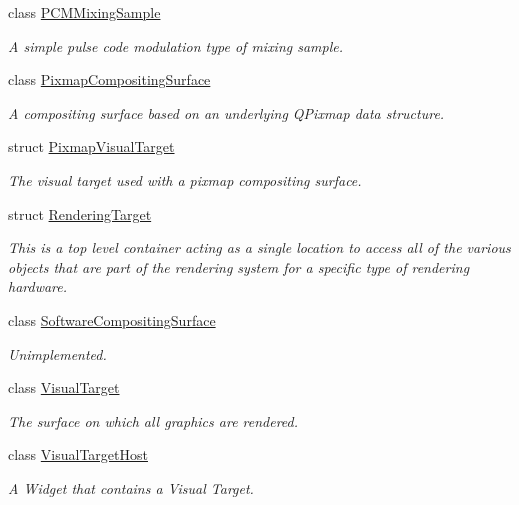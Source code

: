 \begin{DoxyCompactItemize}
class \hyperlink{class_picto_1_1_p_c_m_mixing_sample}{P\-C\-M\-Mixing\-Sample}
\begin{DoxyCompactList}\small\item\em A simple pulse code modulation type of mixing sample. \end{DoxyCompactList}\item 
class \hyperlink{class_picto_1_1_pixmap_compositing_surface}{Pixmap\-Compositing\-Surface}
\begin{DoxyCompactList}\small\item\em A compositing surface based on an underlying Q\-Pixmap data structure. \end{DoxyCompactList}\item 
struct \hyperlink{struct_picto_1_1_pixmap_visual_target}{Pixmap\-Visual\-Target}
\begin{DoxyCompactList}\small\item\em The visual target used with a pixmap compositing surface. \end{DoxyCompactList}\item 
struct \hyperlink{struct_picto_1_1_rendering_target}{Rendering\-Target}
\begin{DoxyCompactList}\small\item\em This is a top level container acting as a single location to access all of the various objects that are part of the rendering system for a specific type of rendering hardware. \end{DoxyCompactList}\item 
class \hyperlink{class_picto_1_1_software_compositing_surface}{Software\-Compositing\-Surface}
\begin{DoxyCompactList}\small\item\em Unimplemented. \end{DoxyCompactList}\item 
class \hyperlink{class_picto_1_1_visual_target}{Visual\-Target}
\begin{DoxyCompactList}\small\item\em The surface on which all graphics are rendered. \end{DoxyCompactList}\item 
class \hyperlink{class_picto_1_1_visual_target_host}{Visual\-Target\-Host}
\begin{DoxyCompactList}\small\item\em A Widget that contains a Visual Target. \end{DoxyCompactList}\item 

\end{DoxyCompactItemize}
